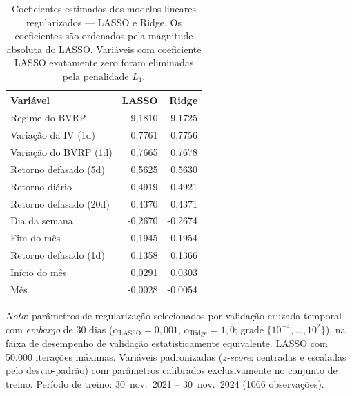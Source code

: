 \begin{table}[H]
\centering
\small
\caption{Coeficientes estimados dos modelos lineares regularizados --- LASSO e Ridge.
Os coeficientes são ordenados pela magnitude absoluta do LASSO.
Variáveis com coeficiente LASSO exatamente zero foram eliminadas pela penalidade $L_1$.}
\label{tab:prev-coeficientes}
\begin{tabular}{lrr}
\toprule
Variável & LASSO & Ridge \\
\midrule
Regime do BVRP & 9,1810 & 9,1725 \\
Variação da IV (1d) & 0,7761 & 0,7756 \\
Variação do BVRP (1d) & 0,7665 & 0,7678 \\
Retorno defasado (5d) & 0,5625 & 0,5630 \\
Retorno diário & 0,4919 & 0,4921 \\
Retorno defasado (20d) & 0,4370 & 0,4371 \\
Dia da semana & -0,2670 & -0,2674 \\
Fim do mês & 0,1945 & 0,1954 \\
Retorno defasado (1d) & 0,1358 & 0,1366 \\
Início do mês & 0,0291 & 0,0303 \\
Mês & -0,0028 & -0,0054 \\
\bottomrule
\end{tabular}
\par\smallskip
\footnotesize\textit{Nota}: parâmetros de regularização selecionados por validação cruzada temporal com \textit{embargo} de 30 dias ($\alpha_{\text{LASSO}} = 0{,}001$, $\alpha_{\text{Ridge}} = 1{,}0$; grade $\{10^{-4}, \ldots, 10^{2}\}$), na faixa de desempenho de validação estatisticamente equivalente. LASSO com 50.000 iterações máximas. Variáveis padronizadas (\textit{z-score}: centradas e escaladas pelo desvio-padrão) com parâmetros calibrados exclusivamente no conjunto de treino. Período de treino: 30~nov.\ 2021 -- 30~nov.\ 2024 (1066 observações).
\end{table}